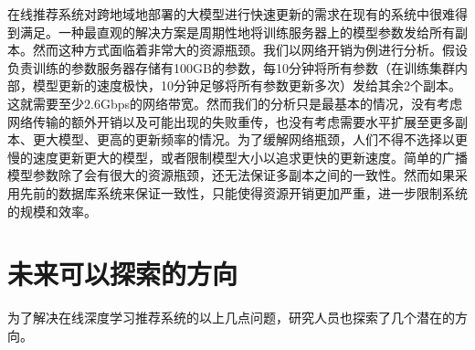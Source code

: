 \documentclass[letterpaper,10pt,english]{sphinxmanual}
\begin{document}
\sphinxAtStartPar
在线推荐系统对跨地域地部署的大模型进行快速更新的需求在现有的系统中很难得到满足。一种最直观的解决方案是周期性地将训练服务器上的模型参数发给所有副本。然而这种方式面临着非常大的资源瓶颈。我们以网络开销为例进行分析。假设负责训练的参数服务器存储有100GB的参数，每10分钟将所有参数（在训练集群内部，模型更新的速度极快，10分钟足够将所有参数更新多次）发给其余2个副本。这就需要至少2.6Gbps的网络带宽。然而我们的分析只是最基本的情况，没有考虑网络传输的额外开销以及可能出现的失败重传，也没有考虑需要水平扩展至更多副本、更大模型、更高的更新频率的情况。为了缓解网络瓶颈，人们不得不选择以更慢的速度更新更大的模型，或者限制模型大小以追求更快的更新速度。简单的广播模型参数除了会有很大的资源瓶颈，还无法保证多副本之间的一致性。然而如果采用先前的数据库系统来保证一致性，只能使得资源开销更加严重，进一步限制系统的规模和效率。


\section{未来可以探索的方向}
\label{\detokenize{chapter_recommender_system/future:id1}}\label{\detokenize{chapter_recommender_system/future::doc}}
\sphinxAtStartPar
为了解决在线深度学习推荐系统的以上几点问题，研究人员也探索了几个潜在的方向。
\end{document}
